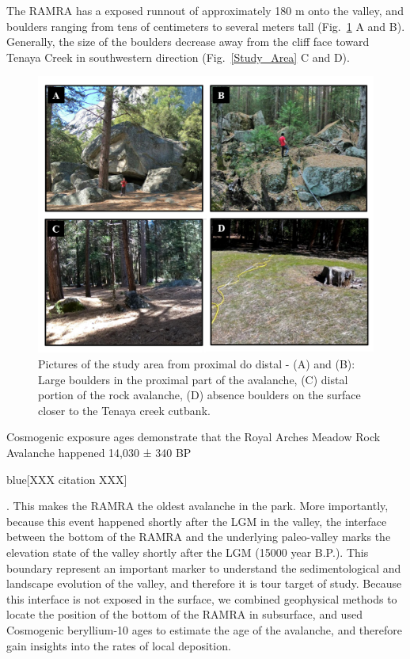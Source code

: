 \documentclass[5p]{elsarticle}
\newcommand{\COMON}{\begin{color}{blue}}
\newcommand{\COMOFF}{\end{color}}
\begin{document}
The RAMRA has a exposed runnout of approximately 180 m onto the valley, and boulders ranging from tens of centimeters to several meters tall (Fig.~\ref{Study_Area2} A and B). Generally, the size of the boulders decrease away from the cliff face toward Tenaya Creek in southwestern direction (Fig.~\ref{Study_Area} C and D).



                             \begin{figure}[h]

  \includegraphics[width=\textwidth]{Study_Area2.pdf}
  \caption{ Pictures of the study area from proximal do distal - (A) and (B): Large boulders in the proximal part of the avalanche, (C) distal portion of the rock avalanche, (D) absence boulders on the surface closer to the Tenaya creek cutbank. 
  \label{Study_Area2}}
  
                            \end{figure}



Cosmogenic  exposure ages demonstrate that the Royal Arches Meadow Rock Avalanche happened 14,030 ± 340 BP \COMON[XXX citation XXX]\COMOFF. This makes the RAMRA the oldest avalanche in the park. More importantly, because this event happened shortly after the LGM in the valley, the interface between the bottom of the RAMRA and the underlying paleo-valley marks the elevation state of the valley shortly after the LGM (15000 year B.P.). This boundary represent an important marker to understand the sedimentological and landscape evolution of the valley, and therefore it is tour target of study. Because this interface is not exposed in the surface, we combined geophysical methods to locate the position of the bottom of the RAMRA in subsurface, and used Cosmogenic beryllium-10 ages to estimate the age of the avalanche, and therefore  gain insights into the rates of local deposition.
\end{document}
